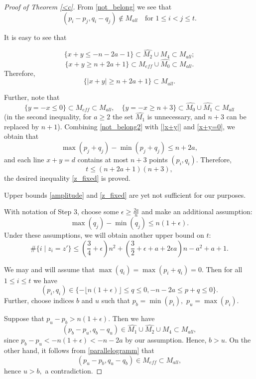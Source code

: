 \documentclass[11pt,leqno]{amsart}
\numberwithin{equation}{section}
\begin{document}
\begin{proof}[Proof of Theorem \ref{<c}]
From \eqref{not_belong} we see that
\begin{equation}\label{not_belong2}(p_i-p_j,q_i-q_j)\notin M_{all}\quad\text{for }1\leq i<j\leq t.\end{equation}

It is easy to see that

$$\{x+y\leq -n-2a-1\}\subset \widehat{M_2}\cup M_4\subset M_{all};$$
$$\{x+y\geq n+2a+1\}\subset M_{eff}\cup \widehat{M_0}\subset M_{all}.$$
Therefore,
\begin{equation}\label{|x+y|}\{|x+y|\geq n+2a+1\}\subset M_{all}.\end{equation}

Further, note that
\begin{equation}\label{x+y=0}\{y=-x\leq 0\}\subset M_{eff}\subset M_{all},\quad \{y=-x\geq n+3\}\subset \widehat{M_0}\cup \widehat{M_1}\subset M_{all}\end{equation}
(in the second inequality, for $a\geq 2$ the set $\widehat{M_1}$ is unnecessary, and $n+3$ can be replaced by $n+1$). Combining \eqref{not_belong2} with \eqref{|x+y|} and \eqref{x+y=0}, we obtain that
$$\max(p_j+q_j)-\min(p_j+q_j)\leq n+2a,$$
and each line $x+y=d$ contains at most $n+3$ points $(p_i,q_i).$ Therefore,
$$t\leq (n+2a+1)(n+3),$$ the desired inequality \eqref{z_fixed} is proved.

Upper bounds \eqref{amplitude} and \eqref{z_fixed} are yet not sufficient for our purposes.

\smallskip

{} With notation of Step 3, choose some $\epsilon\geq \frac{2a}n$ and make an additional assumption:
\begin{equation}\max(q_j)-\min(q_j)\leq n(1+\epsilon).\end{equation}
Under these assumptions, we will obtain another upper bound on $t:$
\begin{equation}\label{z_fixed_str}\#\{i\mid z_i=z'\}\leq (\frac34+\epsilon)n^2+(\frac32+\epsilon+a+2\epsilon a)n-a^2+a+1.\end{equation}

We may and will assume that $\max(q_i)=\max(p_i+q_i)=0.$ Then for all $1\leq i\leq t$ we have
\begin{equation}\label{parallelogramm}(p_i,q_i)\in\{-\lfloor n(1+\epsilon)\rfloor\leq q\leq 0,-n-2a\leq p+q\leq 0\}.\end{equation}
Further, choose indices $b$ and $u$ such that $p_b=\min(p_i),$ $p_u=\max(p_i).$

Suppose that $p_u-p_b> n(1+\epsilon).$ Then we have
$$(p_b-p_u,q_b-q_u)\in \widehat{M_1}\cup\widehat{M_2}\cup M_4\subset M_{all},$$
since $p_b-p_u<-n(1+\epsilon)<-n-2a$ by our assumption. Hence, $b>u.$
On the other hand, it follows from \eqref{parallelogramm} that
$$(p_u-p_b,q_u-q_b)\in M_{eff}\subset M_{all},$$
hence $u>b,$ a contradiction.


\end{proof}
\end{document}
